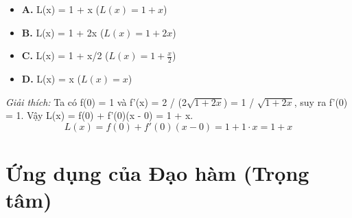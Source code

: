 \documentclass[11pt,a4paper,oneside]{book}
\begin{document}
\begin{enumerate}[label=\textbf{Câu \arabic*:}, leftmargin=2.2em, itemsep=8pt]
\begin{itemize}[label={}, leftmargin=1em, itemsep=2pt]
    \item \textbf{A.} L(x) = 1 + x \quad ($L(x) = 1 + x$)
    \item \textbf{B.} L(x) = 1 + 2x \quad ($L(x) = 1 + 2x$)
    \item \textbf{C.} L(x) = 1 + x/2 \quad ($L(x) = 1 + \frac{x}{2}$)
    \item \textbf{D.} L(x) = x \quad ($L(x) = x$)
  \end{itemize}
  \vspace{2pt}
   \textit{Giải thích:} Ta có f(0) = 1 và f'(x) = 2 / (2$\sqrt{1 + 2x}$) = 1 / $\sqrt{1 + 2x}$, suy ra f'(0) = 1. Vậy L(x) = f(0) + f'(0)(x - 0) = 1 + x.
  \[ L(x) = f(0) + f'(0)(x - 0) = 1 + 1\cdot x = 1 + x \]
\end{enumerate}

\chapter{Ứng dụng của Đạo hàm (Trọng tâm)}
\label{chap:chuong-4}
\end{document}
